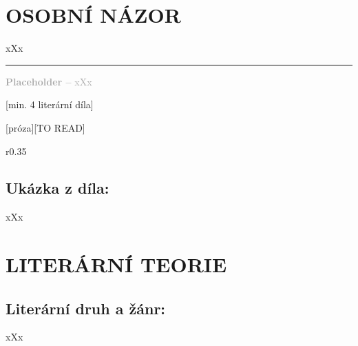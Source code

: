\documentclass{extarticle} %
\begin{document}


\section*{OSOBNÍ NÁZOR}
\noindent 
xXx

\vfill

\noindent\begin{minipage}{\textwidth}
    \textcolor{darkgray}{\rule{\linewidth}{0.4pt}
    \footnotesize
    \textbf{Placeholder --} xXx
    }
\end{minipage}


\newpage

[min. 4 literární díla]


\changefontsize{8pt}

[próza][TO READ]

\noindent\begin{wrapfigure}{r}{0.35\textwidth}
\tiny

\subsection*{Ukázka z díla:}
\setlength{\parindent}{3pt}
xXx
\end{wrapfigure}

\section*{LITERÁRNÍ TEORIE}

\subsection*{Literární druh a žánr:}
\noindent xXx


\end{document}
